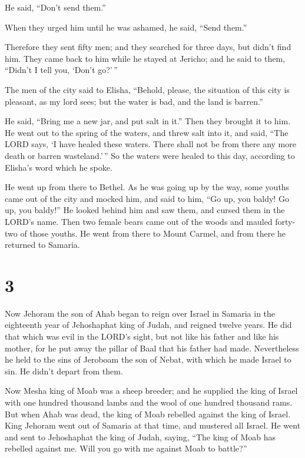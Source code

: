 He said, ``Don't send them.''

 When they urged him until he was ashamed, he said, ``Send
them.''

Therefore they sent fifty men; and they searched for three days, but
didn't find him.  They came back to him while he stayed at
Jericho; and he said to them, ``Didn't I tell you, `Don't go?'\,''

 The men of the city said to Elisha, ``Behold, please, the
situation of this city is pleasant, as my lord sees; but the water is
bad, and the land is barren.''

 He said, ``Bring me a new jar, and put salt in it.'' Then
they brought it to him.  He went out to the spring of the
waters, and threw salt into it, and said, ``The LORD says, `I have
healed these waters. There shall not be from there any more death or
barren wasteland.'\,''  So the waters were healed to this
day, according to Elisha's word which he spoke.

 He went up from there to Bethel. As he was going up by the
way, some youths came out of the city and mocked him, and said to him,
``Go up, you baldy! Go up, you baldy!''  He looked behind
him and saw them, and cursed them in the LORD's name. Then two female
bears came out of the woods and mauled forty-two of those youths.
 He went from there to Mount Carmel, and from there he
returned to Samaria.

\hypertarget{section-2}{%
\section{3}\label{section-2}}

 Now Jehoram the son of Ahab began to reign over Israel in
Samaria in the eighteenth year of Jehoshaphat king of Judah, and reigned
twelve years.  He did that which was evil in the LORD's
sight, but not like his father and like his mother, for he put away the
pillar of Baal that his father had made.  Nevertheless he
held to the sins of Jeroboam the son of Nebat, with which he made Israel
to sin. He didn't depart from them.

 Now Mesha king of Moab was a sheep breeder; and he supplied
the king of Israel with one hundred thousand lambs and the wool of one
hundred thousand rams.  But when Ahab was dead, the king of
Moab rebelled against the king of Israel.  King Jehoram went
out of Samaria at that time, and mustered all Israel.  He
went and sent to Jehoshaphat the king of Judah, saying, ``The king of
Moab has rebelled against me. Will you go with me against Moab to
battle?''

